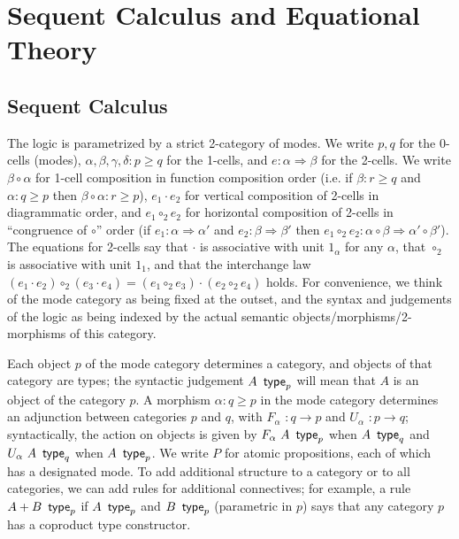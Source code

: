 \documentclass{drl-common/llncs}
\newcommand{\tc}[2]{\ensuremath{#1 \Rightarrow #2}}
\newcommand\compo[2]{\ensuremath{#1 \circ #2}}
\newcommand\compv[2]{\ensuremath{#1 \cdot #2}}
\newcommand\comph[2]{\ensuremath{#1 \mathbin{\circ_2} #2}}
\renewcommand\wftp[2]{\ensuremath{#1 \,\,\, \dsd{type}_{#2}}}
\newcommand\F[2]{\ensuremath{F_{#1} \,\, #2}}
\newcommand\U[2]{\ensuremath{U_{#1} \,\, #2}}
\newcommand\coprd[2]{\ensuremath{#1 + #2}}
\begin{document}
\section{Sequent Calculus and Equational Theory}
\label{sec:rules}

\subsection{Sequent Calculus}

The logic is parametrized by a strict 2-category of modes.  We write
$p,q$ for the 0-cells (modes), $\alpha,\beta,\gamma,\delta : p \ge q$
for the 1-cells, and $e : \tc \alpha \beta$ for the 2-cells.  We write
\compo{\beta}{\alpha} for 1-cell composition in function composition
order (i.e. if $\beta : r \ge q$ and $\alpha : q \ge p$ then
$\compo{\beta}{\alpha} : r \ge p$), \compv{e_1}{e_2} for vertical
composition of 2-cells in diagrammatic order, and \comph{e_1}{e_2} for
horizontal composition of 2-cells in ``congruence of \compo{}{}'' order
(if $e_1 : \tc \alpha {\alpha'}$ and $e_2 : \tc \beta \beta'$ then
$\comph{e_1}{e_2} :
\tc{\compo{\alpha}{\beta}}{\compo{\alpha'}{\beta'}}$).  The equations
for 2-cells say that \compv{}{} is associative with unit $1_\alpha$ for
any $\alpha$, that \comph{}{} is associative with unit $1_1$, and that
the interchange law $\comph{(\compv{e_1}{e_2})}{(\compv{e_3}{e_4})} =
\compv{(\comph{e_1}{e_3})}{(\comph{e_2}{e_4})}$ holds.  For convenience,
we think of the mode category as being fixed at the outset, and the
syntax and judgements of the logic as being indexed by the actual
semantic objects/morphisms/2-morphisms of this category.

Each object $p$ of the mode category determines a category, and objects
of that category are types; the syntactic judgement \wftp{A}{p} will
mean that $A$ is an object of the category $p$.  A morphism $\alpha : q
\ge p$ in the mode category determines an adjunction between categories
$p$ and $q$, with $\F \alpha {} : q \to p$ and $\U \alpha {} : p \to q$;
syntactically, the action on objects is given by $\wftp{\F \alpha A}{p}$
when $\wftp{A}{q}$ and $\wftp{\U \alpha A}{q}$ when $\wftp{A}{p}$.  We
write $P$ for atomic propositions, each of which has a designated mode.
To add additional structure to a category or to all categories, we can
add rules for additional connectives; for example, a rule
\wftp{\coprd{A}{B}}{p} if \wftp{A}{p} and \wftp{B}{p} (parametric in
$p$) says that any category $p$ has a coproduct type constructor.
\end{document}
